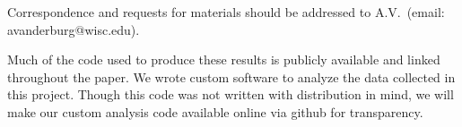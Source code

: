 \documentclass{nature3}
\begin{document}
\begin{addendum}
 \item[Correspondence] Correspondence and requests for materials should be addressed to A.V.~(email: avanderburg@wisc.edu).
 
 \item[Code availability] Much of the code used to produce these results is publicly available and linked throughout the paper. We wrote custom software to analyze the data collected in this project. Though this code was not written with distribution in mind, we will make our custom analysis code available online via github for transparency. 
 
\end{addendum}

\end{document}
